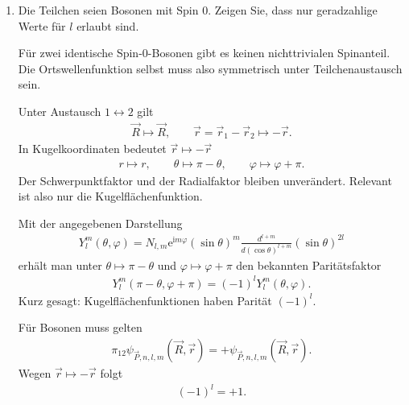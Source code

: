 \documentclass[11pt,a4paper]{scrartcl}
\newcommand{\e}{\mathrm e}
\newcommand{\ii}{\mathrm i}
\newcommand{\Pex}{\pi_{12}}
\begin{document}
\begin{enumerate}[label=(\alph*)]
        \item Die Teilchen seien Bosonen mit Spin $0$. Zeigen Sie, dass nur geradzahlige Werte für $l$ erlaubt sind.

        \begin{calculationbox}
            Für zwei identische Spin-$0$-Bosonen gibt es keinen nichttrivialen Spinanteil. Die Ortswellenfunktion selbst muss also symmetrisch unter Teilchenaustausch sein.

            \begin{calculationbox}[title=Wirkung des Teilchenaustauschs]
                Unter Austausch $1\leftrightarrow 2$ gilt
                \begin{align*}
                    \vec R\mapsto \vec R,
                    \qquad
                    \vec r=\vec r_1-\vec r_2\mapsto -\vec r.
                \end{align*}
                In Kugelkoordinaten bedeutet $\vec r\mapsto -\vec r$
                \begin{align*}
                    r\mapsto r,
                    \qquad
                    \theta\mapsto \pi-\theta,
                    \qquad
                    \varphi\mapsto \varphi+\pi.
                \end{align*}
                Der Schwerpunktfaktor und der Radialfaktor bleiben unverändert. Relevant ist also nur die Kugelflächenfunktion.
            \end{calculationbox}

            \begin{calculationbox}[title=Parität der Kugelflächenfunktionen]
                Mit der angegebenen Darstellung
                \begin{align*}
                    Y_l^m(\theta,\varphi)
                    =
                    N_{l,m}\e^{\ii m\varphi}(\sin\theta)^m
                    \frac{d^{l+m}}{d(\cos\theta)^{l+m}}(\sin\theta)^{2l}
                \end{align*}
                erhält man unter $\theta\mapsto \pi-\theta$ und $\varphi\mapsto \varphi+\pi$ den bekannten Paritätsfaktor
                \begin{align*}
                    Y_l^m(\pi-\theta,\varphi+\pi)=(-1)^lY_l^m(\theta,\varphi).
                \end{align*}
                Kurz gesagt: Kugelflächenfunktionen haben Parität $(-1)^l$.
            \end{calculationbox}

            \begin{calculationbox}[title=Bosonische Symmetriebedingung]
                Für Bosonen muss gelten
                \begin{align*}
                    \Pex\psi_{\vec P,n,l,m}(\vec R,\vec r)=+\psi_{\vec P,n,l,m}(\vec R,\vec r).
                \end{align*}
                Wegen $\vec r\mapsto -\vec r$ folgt
                \begin{align*}
                    (-1)^l=+1.
                \end{align*}


\end{calculationbox}
\end{calculationbox}
\end{enumerate}
\end{document}

